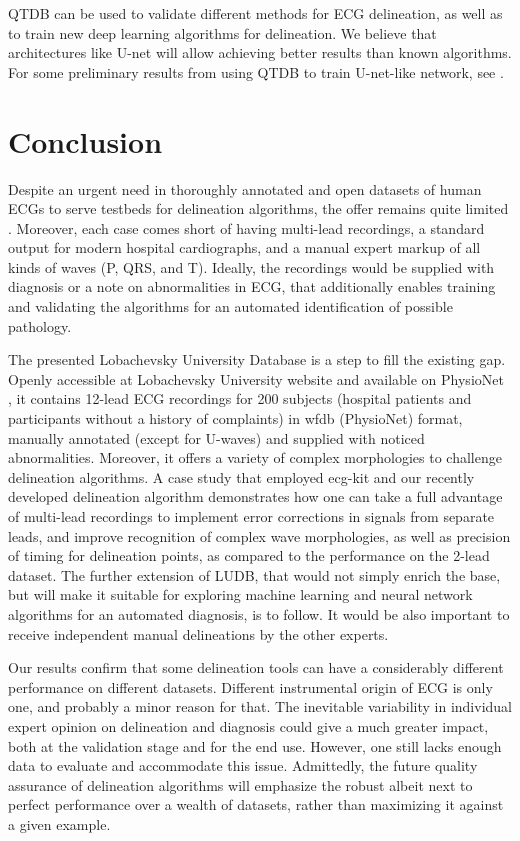 \documentclass[submitted]{ieeeaccess}
\newcommand{\NewCorrection}[1]{{#1}}
\begin{document}
\NewCorrection{QTDB can be used to validate different methods for ECG delineation, as well as to train new deep learning algorithms for delineation. We believe that architectures like U-net \cite{Ronneberger2015} will allow achieving better results than known algorithms. For some preliminary results from using QTDB to train U-net-like network, see \cite{Moskalenko2019}.}

\section{Conclusion}\label{conclusions}

Despite an urgent need in thoroughly annotated and open datasets of human ECGs to serve testbeds for delineation algorithms, the offer remains quite limited \cite{mitdb,edb,qtdb}. Moreover, each case comes short of having multi-lead recordings, a standard output for modern hospital cardiographs,  and a manual expert markup of all kinds of waves (P, QRS, and T). Ideally, the recordings would be supplied with diagnosis or a note on abnormalities in ECG, that additionally enables training and validating the algorithms for an automated identification of possible pathology. 

The presented Lobachevsky University Database is a step to fill the existing gap. Openly accessible at Lobachevsky University website and \NewCorrection{available on} PhysioNet \cite{Our_PhysioNet}, it contains 12-lead ECG recordings for 200 subjects (hospital patients and participants without a history of complaints) in wfdb (PhysioNet) format, manually annotated \NewCorrection{(except for U-waves)} and \NewCorrection{supplied} with noticed abnormalities. Moreover, it offers a variety of complex morphologies to challenge delineation algorithms. A case study that employed ecg-kit \cite{ECGKit} and our recently developed delineation algorithm \cite{Kalyakulina2018} demonstrates how one can take a full advantage of multi-lead recordings to implement error corrections in signals from separate leads, and improve recognition of complex wave morphologies, as well as precision of timing for delineation points, as compared to the performance on the 2-lead dataset. The further \NewCorrection{extension} of LUDB, that would not simply enrich the base, but will make it suitable for exploring machine learning and neural network algorithms for an automated diagnosis, is to follow. It would be also important to receive independent manual delineations by the other experts.

 Our results confirm that some delineation tools can have a considerably different performance on different datasets. Different instrumental origin of ECG is only one, and probably a minor reason for that. The inevitable variability in individual expert opinion on delineation and diagnosis could give a much greater impact, both at the validation stage and for the end use. However, one still lacks enough data to evaluate and \NewCorrection{accommodate} this issue. \NewCorrection{Admittedly}, the future quality assurance of delineation algorithms will \NewCorrection{emphasize} the robust albeit next to perfect performance over a wealth of datasets, rather than maximizing it against a given example.
\end{document}

